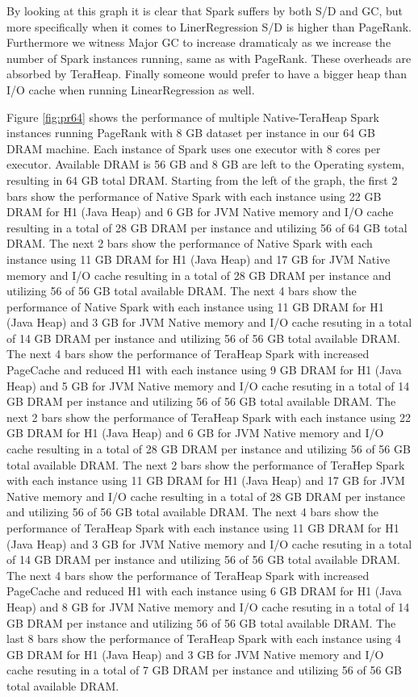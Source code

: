 \documentclass[twocolumn,10pt]{asme2e}
\begin{document}
By looking at this graph it is clear that Spark suffers by both S/D and GC, but more specifically when it comes to LinerRegression S/D is higher than PageRank. Furthermore we witness Major GC to increase dramaticaly as we increase the number of Spark instances running, same as with PageRank. These overheads are absorbed by TeraHeap. Finally someone would prefer to have a bigger heap than I/O cache when running LinearRegression as well.

Figure \ref{fig:pr64} shows the performance of multiple Native-TeraHeap Spark instances running PageRank with 8 GB dataset per instance in our 64 GB DRAM machine. Each instance of Spark uses one executor with 8 cores per executor. Available DRAM is 56 GB and 8 GB are left to the Operating system, resulting in 64 GB total DRAM. Starting from the left of the graph, the first 2 bars show the performance of Native Spark with each instance using 22 GB DRAM for H1 (Java Heap) and 6 GB for JVM Native memory and I/O cache resulting in a total of 28 GB DRAM per instance and utilizing 56 of 64 GB total DRAM. The next 2 bars show the performance of Native Spark with each instance using 11 GB DRAM for H1 (Java Heap) and 17 GB for JVM Native memory and I/O cache resulting in a total of 28 GB DRAM per instance and utilizing 56 of 56 GB total available DRAM. The next 4 bars show the performance of Native Spark with each instance using 11 GB DRAM for H1 (Java Heap) and 3 GB for JVM Native memory and I/O cache resuting in a total of 14 GB DRAM per instance and utilizing 56 of 56 GB total available DRAM. The next 4 bars show the performance of TeraHeap Spark with increased PageCache and reduced H1 with each instance using 9 GB DRAM for H1 (Java Heap) and 5 GB for JVM Native memory and I/O cache resuting in a total of 14 GB DRAM per instance and utilizing 56 of 56 GB total available DRAM. 
The next 2 bars show the performance of TeraHeap Spark with each instance using 22 GB DRAM for H1 (Java Heap) and 6 GB for JVM Native memory and I/O cache resulting in a total of 28 GB DRAM per instance and utilizing 56 of 56 GB total available DRAM. The next 2 bars show the performance of TeraHep Spark with each instance using 11 GB DRAM for H1 (Java Heap) and 17 GB for JVM Native memory and I/O cache resulting in a total of 28 GB DRAM per instance and utilizing 56 of 56 GB total available DRAM. The next 4 bars show the performance of TeraHeap Spark with each instance using 11 GB DRAM for H1 (Java Heap) and 3 GB for JVM Native memory and I/O cache resuting in a total of 14 GB DRAM per instance and utilizing 56 of 56 GB total available DRAM. The next 4 bars show the performance of TeraHeap Spark with increased PageCache and reduced H1 with each instance using 6 GB DRAM for H1 (Java Heap) and 8 GB for JVM Native memory and I/O cache resuting in a total of 14 GB DRAM per instance and utilizing 56 of 56 GB total available DRAM. The last 8 bars show the performance of TeraHeap Spark with each instance using 4 GB DRAM for H1 (Java Heap) and 3 GB for JVM Native memory and I/O cache resuting in a total of 7 GB DRAM per instance and utilizing 56 of 56 GB total available DRAM.  
\end{document}
